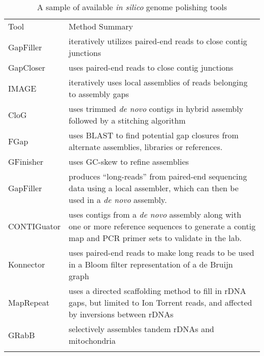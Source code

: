 \documentclass[a4,center,fleqn]{NAR}
\begin{document}
\begin{table*}[b]
\centering
\caption{A sample of available \textit{\textit{in silico}} genome polishing tools}
\label{table:tools}
\begin{tabular*}{\textwidth}{p{2.7cm}p{13cm}}
  \toprule
  Tool &  Method Summary \\
  \colrule
  GapFiller\cite{Boetzer2012} & iteratively utilizes paired-end reads to close contig junctions \\

  GapCloser\cite{Luo2012} & uses paired-end reads to close contig junctions \\

  IMAGE \cite{Tsai2010} & iteratively uses local assemblies of reads belonging to  assembly gaps \\

  CloG \cite{Yang2011} & uses trimmed \textit{de novo} contigs in hybrid assembly followed by a stitching algorithm \\

  FGap \cite{Piro2014,Guizelini2016} & uses BLAST to find potential gap closures from alternate assemblies, libraries or references. \\

  GFinisher \cite{Guizelini2016} & uses GC-skew to refine assemblies \\

  GapFiller \cite{Nadalin2012} &  produces ``long-reads'' from paired-end sequencing data using a local assembler, which can then be used in a \textit{de novo} assembly. \\

  CONTIGuator\cite{Galardini2011} & uses contigs from a \textit{de novo} assembly along with one or more reference sequences to generate a contig map and PCR primer sets to validate in the lab. \\

  Konnector\cite{Vandervalk2015} & uses paired-end reads to make long reads to be used in a Bloom filter representation of a de Bruijn graph \\

  MapRepeat\cite{Mariano2015} & uses a directed scaffolding method to fill in rDNA gaps, but limited to Ion Torrent reads, and affected by inversions between rDNAs \cite{Mariano2016} \\

  GRabB\cite{Brankovics2016} & selectively assembles tandem rDNAs and mitochondria\\
  \botrule
\end{tabular*}
\end{table*}
\end{document}
